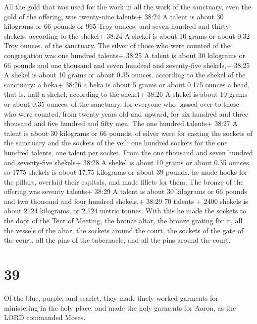  All the gold that was used for the work in all the work of
the sanctuary, even the gold of the offering, was twenty-nine talents+
38:24 A talent is about 30 kilograms or 66 pounds or 965 Troy ounces.
and seven hundred and thirty shekels, according to the shekel+ 38:24 A
shekel is about 10 grams or about 0.32 Troy ounces. of the sanctuary.
 The silver of those who were counted of the congregation
was one hundred talents+ 38:25 A talent is about 30 kilograms or 66
pounds and one thousand and seven hundred and seventy-five shekels,+
38:25 A shekel is about 10 grams or about 0.35 ounces. according to the
shekel of the sanctuary:  a beka+ 38:26 a beka is about 5
grams or about 0.175 ounces a head, that is, half a shekel, according to
the shekel+ 38:26 A shekel is about 10 grams or about 0.35 ounces. of
the sanctuary, for everyone who passed over to those who were counted,
from twenty years old and upward, for six hundred and three thousand and
five hundred and fifty men.  The one hundred talents+ 38:27
A talent is about 30 kilograms or 66 pounds. of silver were for casting
the sockets of the sanctuary and the sockets of the veil: one hundred
sockets for the one hundred talents, one talent per socket.
 From the one thousand and seven hundred and seventy-five
shekels+ 38:28 A shekel is about 10 grams or about 0.35 ounces, so 1775
shekels is about 17.75 kilograms or about 39 pounds. he made hooks for
the pillars, overlaid their capitals, and made fillets for them.
 The bronze of the offering was seventy talents+ 38:29 A
talent is about 30 kilograms or 66 pounds and two thousand and four
hundred shekels.+ 38:29 70 talents + 2400 shekels is about 2124
kilograms, or 2.124 metric tonnes.  With this he made the
sockets to the door of the Tent of Meeting, the bronze altar, the bronze
grating for it, all the vessels of the altar,  the sockets
around the court, the sockets of the gate of the court, all the pins of
the tabernacle, and all the pins around the court.

\hypertarget{section-38}{%
\section{39}\label{section-38}}

 Of the blue, purple, and scarlet, they made finely worked
garments for ministering in the holy place, and made the holy garments
for Aaron, as the LORD commanded Moses.

